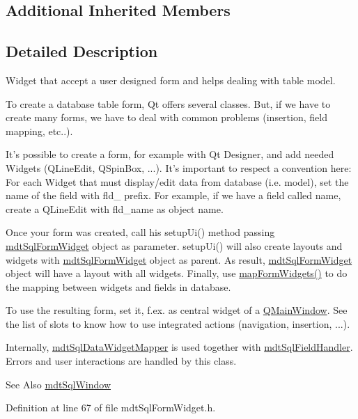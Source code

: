 \subsection*{Additional Inherited Members}


\subsection{Detailed Description}
Widget that accept a user designed form and helps dealing with table model. 

To create a database table form, Qt offers several classes. But, if we have to create many forms, we have to deal with common problems (insertion, field mapping, etc..).

It's possible to create a form, for example with Qt Designer, and add needed Widgets (Q\-Line\-Edit, Q\-Spin\-Box, ...). It's important to respect a convention here\-: For each Widget that must display/edit data from database (i.\-e. model), set the name of the field with fld\-\_\- prefix. For example, if we have a field called name, create a Q\-Line\-Edit with fld\-\_\-name as object name.

Once your form was created, call his setup\-Ui() method passing \hyperlink{classmdt_sql_form_widget}{mdt\-Sql\-Form\-Widget} object as parameter. setup\-Ui() will also create layouts and widgets with \hyperlink{classmdt_sql_form_widget}{mdt\-Sql\-Form\-Widget} object as parent. As result, \hyperlink{classmdt_sql_form_widget}{mdt\-Sql\-Form\-Widget} object will have a layout with all widgets. Finally, use \hyperlink{classmdt_sql_form_widget_ad7933613a2d113d403d539ac8957e044}{map\-Form\-Widgets()} to do the mapping between widgets and fields in database.

To use the resulting form, set it, f.\-ex. as central widget of a \hyperlink{class_q_main_window}{Q\-Main\-Window}. See the list of slots to know how to use integrated actions (navigation, insertion, ...).

Internally, \hyperlink{classmdt_sql_data_widget_mapper}{mdt\-Sql\-Data\-Widget\-Mapper} is used together with \hyperlink{classmdt_sql_field_handler}{mdt\-Sql\-Field\-Handler}. Errors and user interactions are handled by this class.

\begin{DoxySeeAlso}{See Also}
\hyperlink{classmdt_sql_window}{mdt\-Sql\-Window} 
\end{DoxySeeAlso}


Definition at line 67 of file mdt\-Sql\-Form\-Widget.\-h.



